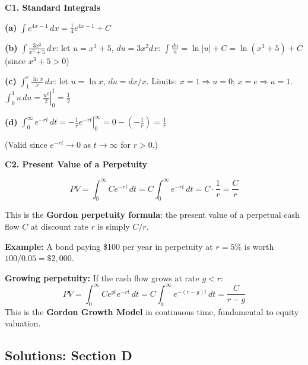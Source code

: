 \documentclass[12pt, a4paper]{article}
\theoremstyle{definition}
\newcommand{\dd}[1]{\,d#1}
\newcommand{\eval}[2]{\left.#1\right|_{#2}}
\begin{document}
\begin{solbox}
\textbf{C1. Standard Integrals}

\textbf{(a)} $\displaystyle\int e^{4x-1}\dd{x} = \frac{1}{4}e^{4x-1}+C$

\textbf{(b)} $\displaystyle\int\frac{3x^2}{x^3+5}\dd{x}$: let $u=x^3+5$, $du=3x^2dx$:
$\displaystyle\int\frac{du}{u}=\ln|u|+C = \ln(x^3+5)+C$ (since $x^3+5>0$)

\textbf{(c)} $\displaystyle\int_1^e\frac{\ln x}{x}\dd{x}$: let $u=\ln x$, $du=dx/x$. Limits: $x=1\Rightarrow u=0$; $x=e\Rightarrow u=1$.
$\displaystyle\int_0^1 u\,du = \eval{\frac{u^2}{2}}{0}^{1} = \frac{1}{2}$

\textbf{(d)} $\displaystyle\int_0^\infty e^{-rt}\dd{t}
= \eval{-\frac{1}{r}e^{-rt}}{0}^{\infty}
= 0 - \left(-\frac{1}{r}\right) = \frac{1}{r}$

(Valid since $e^{-rt}\to 0$ as $t\to\infty$ for $r>0$.)
\end{solbox}

\begin{solbox}
\textbf{C2. Present Value of a Perpetuity}

\[
  PV = \int_0^\infty Ce^{-rt}\dd{t}
     = C\int_0^\infty e^{-rt}\dd{t}
     = C\cdot\frac{1}{r}
     = \frac{C}{r}
\]

This is the \textbf{Gordon perpetuity formula}: the present value of a perpetual cash flow $C$ at discount rate $r$ is simply $C/r$.

\textbf{Example:} A bond paying \$100 per year in perpetuity at $r=5\%$ is worth $100/0.05=\$2{,}000$.

\textbf{Growing perpetuity:} If the cash flow grows at rate $g<r$:
\[
  PV = \int_0^\infty Ce^{gt}e^{-rt}\dd{t}
     = C\int_0^\infty e^{-(r-g)t}\dd{t}
     = \frac{C}{r-g}
\]
This is the \textbf{Gordon Growth Model} in continuous time, fundamental to equity valuation.
\end{solbox}

\subsection{Solutions: Section D}
\end{document}
